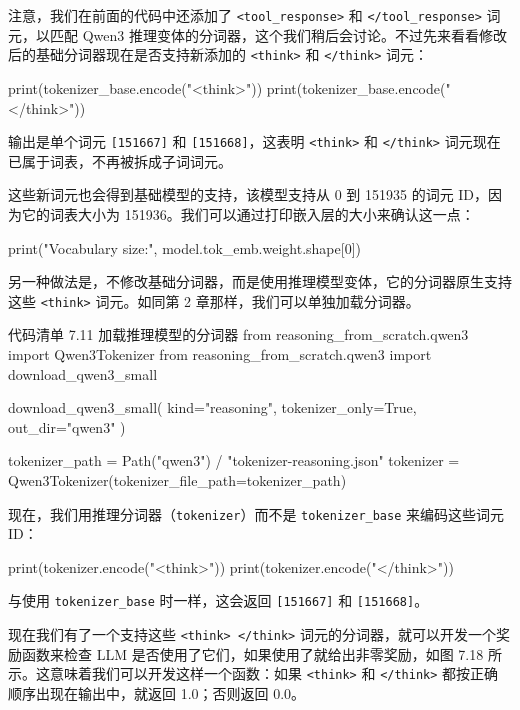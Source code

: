 注意，我们在前面的代码中还添加了 \texttt{\textless{}tool\_response\textgreater{}} 和 \texttt{\textless{}/tool\_response\textgreater{}} 词元，以匹配 Qwen3 推理变体的分词器，这个我们稍后会讨论。不过先来看看修改后的基础分词器现在是否支持新添加的 \texttt{\textless{}think\textgreater{}} 和 \texttt{\textless{}/think\textgreater{}} 词元：

\begin{codebox}
print(tokenizer_base.encode("<think>"))
print(tokenizer_base.encode("</think>"))
\end{codebox}

输出是单个词元 \texttt{[151667]} 和 \texttt{[151668]}，这表明 \texttt{\textless{}think\textgreater{}} 和 \texttt{\textless{}/think\textgreater{}} 词元现在已属于词表，不再被拆成子词词元。

这些新词元也会得到基础模型的支持，该模型支持从 0 到 151935 的词元 ID，因为它的词表大小为 151936。我们可以通过打印嵌入层的大小来确认这一点：

\begin{codebox}
print("Vocabulary size:", model.tok_emb.weight.shape[0])
\end{codebox}

另一种做法是，不修改基础分词器，而是使用推理模型变体，它的分词器原生支持这些 \texttt{\textless{}think\textgreater{}} 词元。如同第 2 章那样，我们可以单独加载分词器。

\begin{codeboxt}{代码清单 7.11 加载推理模型的分词器}
from reasoning_from_scratch.qwen3 import Qwen3Tokenizer
from reasoning_from_scratch.qwen3 import download_qwen3_small

download_qwen3_small(
    kind="reasoning", tokenizer_only=True, out_dir="qwen3"
)

tokenizer_path = Path("qwen3") / "tokenizer-reasoning.json"
tokenizer = Qwen3Tokenizer(tokenizer_file_path=tokenizer_path)
\end{codeboxt}

现在，我们用推理分词器（\texttt{tokenizer}）而不是 \texttt{tokenizer\_base} 来编码这些词元 ID：

\begin{codebox}
print(tokenizer.encode("<think>"))
print(tokenizer.encode("</think>"))
\end{codebox}

与使用 \texttt{tokenizer\_base} 时一样，这会返回 \texttt{[151667]} 和 \texttt{[151668]}。

现在我们有了一个支持这些 \texttt{\textless{}think\textgreater{} \textless{}/think\textgreater{}} 词元的分词器，就可以开发一个奖励函数来检查 LLM 是否使用了它们，如果使用了就给出非零奖励，如图 7.18 所示。这意味着我们可以开发这样一个函数：如果 \texttt{\textless{}think\textgreater{}} 和 \texttt{\textless{}/think\textgreater{}} 都按正确顺序出现在输出中，就返回 1.0；否则返回 0.0。

